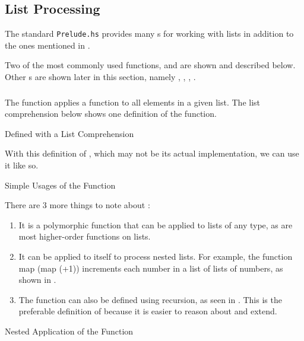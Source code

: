 \subsection{List Processing}\label{subsec:List_Processing}
The standard \texttt{Prelude.hs} provides many s for working with lists in addition to the ones mentioned in .

Two of the most commonly used functions,  and  are shown and described below.
Other s are shown later in this section, namely , , , .

\subsubsection{\texorpdfstring{}{\texttt{map}}}\label{subsubsec:Map_Function}
The  function applies a function to all elements in a given list.
The list comprehension below shows one definition of the  function.
\begin{listing}[h!tbp]
\caption{ Defined with a List Comprehension}
\label{lst:Map_List_Comprehension_Definition}
\end{listing}

With this definition of , which may not be its actual implementation, we can use it like so.
\begin{listing}[h!tbp]
\caption{Simple Usages of the  Function}
\label{lst:Map_Usage-Simple}
\end{listing}

There are 3 more things to note about :
\begin{enumerate}[noitemsep]
\item It is a polymorphic function that can be applied to lists of any type, as are most higher-order functions on lists.
\item It can be applied to itself to process nested lists.
  For example, the function map (map (+1)) increments each number in a list of lists of numbers, as shown in .
\item The  function can also be defined using recursion, as seen in .
  This is the preferable definition of  because it is easier to reason about and extend.
\end{enumerate}
\begin{listing}[h!tbp]
\caption{Nested Application of the  Function}
\label{lst:Map_Usage-Nested_Maps}
\end{listing}

